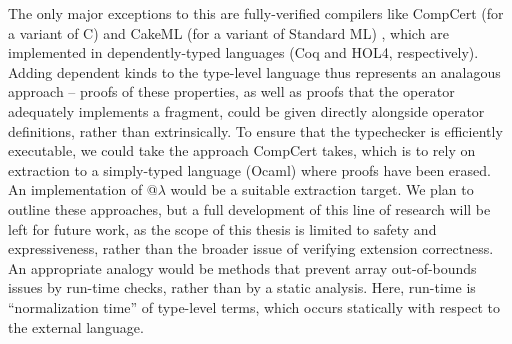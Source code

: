 The only major exceptions to this are fully-verified compilers like CompCert (for a variant of C) \cite{journals/cacm/Leroy09} and CakeML (for a variant of Standard ML) \cite{conf/popl/KumarMNO14}, which are implemented in dependently-typed languages (Coq and HOL4, respectively). Adding dependent kinds to the type-level language thus represents an analagous approach --  proofs of these properties, as well as proofs that the operator adequately implements a fragment, could be given directly alongside operator definitions, rather than extrinsically. To ensure that the typechecker is efficiently executable, we could take the approach CompCert takes, which is to rely on extraction  to a simply-typed language (Ocaml) where proofs have been erased. An implementation of @$\lambda$ would be a suitable extraction target. We plan to outline these  approaches, but a full development of this line of research will be left for future work, as the scope of this thesis is limited to safety and expressiveness, rather than the broader issue of verifying extension correctness. An appropriate analogy would be methods that prevent array out-of-bounds issues by run-time checks, rather than by a static analysis. Here, run-time is ``normalization time'' of type-level terms, which occurs statically with respect to the external language.
